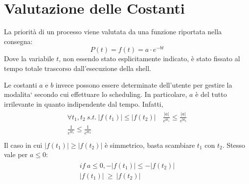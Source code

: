 \documentclass[11pt]{article}
\begin{document}
\section{Valutazione delle Costanti}

La priorit\`a di un processo viene valutata da una funzione riportata nella consegna:
$$
P(t) = f(t) = a \cdot e^{-bt}
$$
Dove la variabile $t$, non essendo stato esplicitamente indicato, \`e stato fissato al tempo totale
 trascorso dall'esecuzione della shell.

Le costanti $a$ e $b$  invece possono essere determinate dell'utente per gestire la
modalita` secondo cui effettuare lo scheduling. In particolare, $a$ \`e del tutto irrilevante
in quanto indipendente dal tempo.
Infatti,
\begin{align}
\begin{split}
 \forall t_1, t_2\ s.t.\ |f(t_1)| \le |f(t_2)| \quad \frac{|a|}{e^{bt_1}} \le \frac{|a|}{e^{bt_2}} \\
  \frac{1}{e^{bt_1}} \le \frac{1}{e^{bt_2}}\\
\end{split}
\end{align}
Il caso in cui $|f(t_1)| \ge |f(t_2)| $ \`e simmetrico, basta scambiare $t_1$ con $t_2$. Stesso vale per
$a \le 0$:
\begin{align}
\begin{split}
 if\ a \le 0, -|f(t_1)| \le -|f(t_2)| \\
 			   |f(t_1)|\ \ge\ |f(t_2)|
\end{split}
\end{align}
\end{document}
